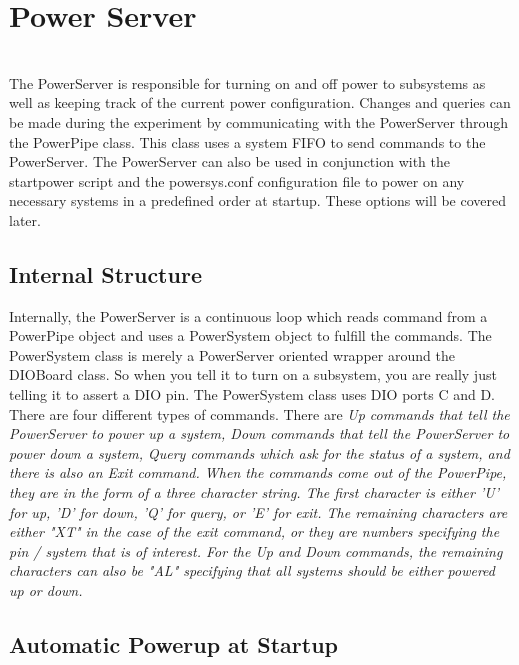 %
\section{Power Server}
\hrulefill
\\ 
The PowerServer is responsible for turning on and off power to subsystems as well as keeping
track of the current power configuration. Changes and queries can be made during the experiment 
by communicating with the PowerServer through the PowerPipe class. This class uses a system FIFO
to send commands to the PowerServer. The PowerServer can also be used in conjunction with the 
startpower script and the powersys.conf configuration file to power on any necessary systems in
a predefined order at startup. These options will be covered later.

\subsection{Internal Structure}

Internally, the PowerServer is a continuous loop which reads command from a PowerPipe object and
uses a PowerSystem object to fulfill the commands. The PowerSystem class is merely a PowerServer
oriented wrapper around the DIOBoard class. So when you tell it to turn on a subsystem, you are
really just telling it to assert a DIO pin. The PowerSystem class uses DIO ports C and D.\\ 
\newline
There are four different types of commands. There are \it Up \rm commands that tell the PowerServer
to power up a system, \it Down \rm commands that tell the PowerServer to power down a system,
\it Query \rm commands which ask for the status of a system, and there is also an \it Exit \rm 
command. When the commands come out of the PowerPipe, they are in the form of a three character string.
The first character is either 'U' for up, 'D' for down, 'Q' for query, or 'E' for exit. The remaining 
characters are either "XT" in the case of the exit command, or they are numbers specifying the pin / system
that is of interest. For the \it Up \rm and \it Down \rm commands, the remaining characters can also be
"AL" specifying that all systems should be either powered up or down.

\subsection{Automatic Powerup at Startup}

